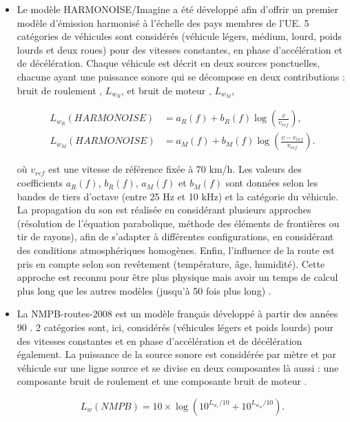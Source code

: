 \begin{itemize}
\item Le modèle HARMONOISE/Imagine \cite{jonasson2004source} a été développé afin d'offrir un premier modèle d'émission harmonisé à l'échelle des pays membres de l'UE. 5 catégories de véhicules sont considérés (véhicule légers, médium,  lourd, poids lourds et deux roues) pour des vitesses constantes, en phase d'accélération et de décélération. Chaque véhicule est décrit en deux sources ponctuelles, chacune ayant une puissance sonore qui se décompose en deux contributions : \og bruit de roulement \fg{}, $L_{w_R}$, et \og bruit de moteur \fg{}, $L_{w_M}$,  

\begin{align}
L_{w_R}(HARMONOISE) &= a_R(f)+b_R(f)\log\left(\frac{v}{v_{ref}}\right),\\
L_{w_M}(HARMONOISE) &= a_M(f)+b_M(f)\log\left(\frac{v-v_{ref}}{v_{ref}}\right).
\end{align}

où $v_{ref}$ est une vitesse de référence fixée à 70 km/h. Les valeurs des coefficients $a_R(f)$, $b_R(f)$, $a_M(f)$ et $b_M(f)$ sont données selon les bandes de tiers d'octave (entre 25 Hz et 10 kHz) et la catégorie du véhicule. La propagation du son est réalisée en considérant plusieurs approches (résolution de l'équation parabolique, méthode des éléments de frontières ou tir de rayons), afin de s'adapter à différentes configurations, en considérant des conditions atmosphériques homogènes. Enfin, l'influence de la route est pris en compte selon son revêtement (température, âge, humidité). Cette approche est reconnu pour être plus \og physique \fg{} mais avoir un temps de calcul plus long que les autres modèles (jusqu'à 50 fois plus long) \cite{probst2011comparison}.

\item La NMPB-routes-2008 est un modèle français développé à partir des années 90 \cite{setra_prevision_2009-1, setra_prevision_2009-2}. 2 catégories sont, ici, considérés (véhicules légers et poids lourds) pour des vitesses constantes et en phase d'accélération et de décélération également.
La puissance de la source sonore est considérée par mètre et par véhicule sur une ligne source et se divise en deux composantes là aussi : une composante \og bruit de roulement \fg{} et une composante \og bruit de moteur \fg{}.

\begin{equation}\label{eq:puissance_NMPB}
L_w(NMPB) = 10\times \log \left(10^{L_{w_r}/10}+10^{L_{w_m}/10}\right).
\end{equation} 


\end{itemize}
